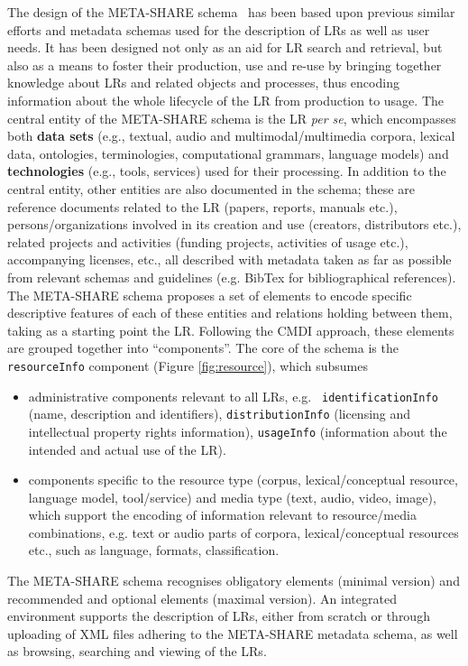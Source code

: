 \documentclass{llncs}
\begin{document}
The design of the META-SHARE schema~\cite{gavrilidou2012metashare} has been based upon previous similar efforts and metadata schemas used for the description of LRs as well as user needs. It has been designed not only as an aid for LR search and retrieval, but also as a means to foster their production, use and re-use by bringing together knowledge about LRs and related objects and processes, thus encoding information about the whole lifecycle of the LR from production to usage.
The central entity of the META-SHARE schema is the LR \textit{per se}, which
encompasses both {\bf data sets} (e.g., textual, audio and multimodal/multimedia
corpora, lexical data, ontologies, terminologies, computational grammars,
language models) and {\bf technologies} (e.g., tools, services) used for their processing. 
In addition to the central entity, other entities are also documented in the schema; these are reference documents related to the LR (papers, reports,
manuals etc.), persons/organizations involved in its creation and use (creators, distributors etc.), related projects and activities (funding projects,
activities of usage etc.), accompanying licenses, etc., all described with metadata taken as far as possible from relevant schemas and guidelines (e.g. BibTex for bibliographical references). 
The META-SHARE schema proposes a set of elements to encode specific descriptive
features of each of these entities and relations holding between them, taking as
a starting point the LR. Following the CMDI approach, these elements are grouped
together into ``components''. The core of the schema is the {\tt resourceInfo}
component (Figure \ref{fig:resource}), which subsumes 
\begin{itemize}
\item administrative components relevant to all LRs, e.g. {\tt
    identificationInfo} (name, description and identifiers), {\tt distributionInfo} (licensing and intellectual property rights information), {\tt usageInfo} (information about the intended and actual use of the LR).
\item components specific to the resource type (corpus, lexical/conceptual
    resource, language model, tool/service) and media type (text, audio, video,
    image), which support the encoding of information relevant to resource/media combinations, e.g. text or audio parts of corpora, lexical/conceptual resources etc., such as language, formats, classification.
\end{itemize} 
The META-SHARE schema recognises obligatory elements (minimal version) and recommended and optional elements (maximal version). 
An integrated environment supports the description of LRs, either from scratch or through uploading of XML files adhering to the META-SHARE metadata schema, as well as browsing, searching and viewing of the LRs.
\end{document}

